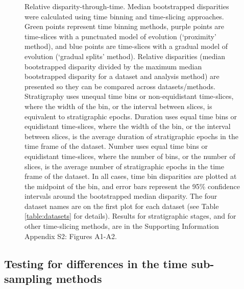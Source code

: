 \documentclass[12pt,a4paper]{article}
\begin{document}
\begin{figure}[!htbp]
    \centering
    \caption[Relative disparity-through-time.]
    {Relative disparity-through-time. Median bootstrapped disparities were calculated using time binning and time-slicing approaches. 
    Green points represent time binning methods, purple points are time-slices with a punctuated model of evolution (`proximity' method), and blue points are time-slices with a gradual model of evolution (`gradual splits' method).
    Relative disparities (median bootstrapped disparity divided by the maximum median bootstrapped disparity for a dataset and analysis method) are presented so they can be compared across datasets/methods. 
    Stratigraphy uses unequal time bins or non-equidistant time-slices, where the width of the bin, or the interval between slices, is equivalent to stratigraphic epochs. 
    Duration uses equal time bins or equidistant time-slices, where the width of the bin, or the interval between slices, is the average duration of stratigraphic epochs in the time frame of the dataset. 
    Number uses equal time bins or equidistant time-slices, where the number of bins, or the number of slices, is the average number of stratigraphic epochs in the time frame of the dataset. 
    In all cases, time bin disparities are plotted at the midpoint of the bin, and error bars represent the 95\% confidence intervals around the bootstrapped median disparity.
    The four dataset names are on the first plot for each dataset (see Table \ref{table:datasets} for details).
    Results for stratigraphic stages, and for other time-slicing methods, are in the Supporting Information Appendix S2: Figures A1-A2.}
    \label{figure:dtt1}
\end{figure}

\subsection{Testing for differences in the time sub-sampling methods}
\end{document}

